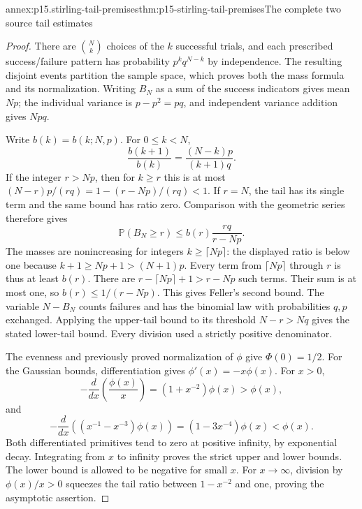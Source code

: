 \begin{annexitem}{annex:p15.stirling-tail-premises}{thm:p15-stirling-tail-premises}{The complete two source tail estimates}
\begin{proof}
There are \(\binom Nk\) choices of the \(k\) successful
trials, and each prescribed success/failure pattern has
probability \(p^kq^{N-k}\) by independence.
The resulting disjoint events partition the sample space,
which proves both the mass formula and its normalization.
Writing \(B_N\) as a sum of the success indicators gives
mean \(Np\); the individual variance is \(p-p^2=pq\),
and independent variance addition gives \(Npq\).

Write \(b(k)=b(k;N,p)\). For \(0\leq k<N\),
\[
 \frac{b(k+1)}{b(k)}=\frac{(N-k)p}{(k+1)q}.
\]
If the integer \(r>Np\), then for \(k\geq r\) this is at
most \((N-r)p/(rq)=1-(r-Np)/(rq)<1\).
If \(r=N\), the tail has its single term and the same
bound has ratio zero.
Comparison with the geometric series therefore gives
\[
 \mathbb P(B_N\geq r)\leq b(r)\frac{rq}{r-Np}.
\]
The masses are nonincreasing for integers
\(k\geq\lceil Np\rceil\): the displayed ratio is below
one because \(k+1\geq Np+1>(N+1)p\).
Every term from \(\lceil Np\rceil\) through \(r\) is thus
at least \(b(r)\). There are
\(r-\lceil Np\rceil+1>r-Np\) such terms.
Their sum is at most one, so \(b(r)\leq1/(r-Np)\).
This gives Feller's second bound.
The variable \(N-B_N\) counts failures and has the
binomial law with probabilities \(q,p\) exchanged.
Applying the upper-tail bound to its threshold \(N-r>Nq\)
gives the stated lower-tail bound. Every division used a
strictly positive denominator.

The evenness and previously proved normalization of \(\phi\)
give \(\Phi(0)=1/2\). For the Gaussian bounds, differentiation gives
\(\phi'(x)=-x\phi(x)\). For \(x>0\),
\[
 -\frac{d}{dx}\left(\frac{\phi(x)}x\right)
          =(1+x^{-2})\phi(x)>\phi(x),
\]
and
\[
 -\frac{d}{dx}\left((x^{-1}-x^{-3})\phi(x)\right)
          =(1-3x^{-4})\phi(x)<\phi(x).
\]
Both differentiated primitives tend to zero at positive
infinity, by exponential decay. Integrating from \(x\)
to infinity proves the strict upper and lower bounds.
The lower bound is allowed to be negative for small \(x\).
For \(x\to\infty\), division by \(\phi(x)/x>0\)
squeezes the tail ratio between \(1-x^{-2}\) and one,
proving the asymptotic assertion.
\end{proof}
\end{annexitem}

